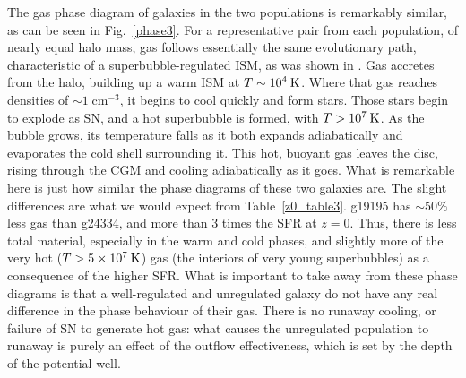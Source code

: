 The gas phase diagram of galaxies in the two populations is remarkably similar,
as can be seen in Fig.~\ref{phase3}.  For a representative pair from each
population, of nearly equal halo mass, gas follows essentially the same
evolutionary path, characteristic of a superbubble-regulated ISM, as was shown in
\citet{Keller2015}.  Gas accretes from the halo,
building up a warm ISM at $T\sim10^4\>{\rm K}$.  Where that gas reaches densities of
$\sim 1\;$cm$^{-3}$, it begins to cool quickly and form stars.  Those stars begin to
explode as SN, and a hot superbubble is formed, with $T>10^7\>{\rm K}$.  As the bubble
grows, its temperature falls as it both expands adiabatically and evaporates
the cold shell surrounding it.  This hot, buoyant gas leaves the disc, rising
through the CGM and cooling adiabatically as it goes.  What is remarkable here
is just how similar the phase diagrams of these two galaxies are.  The slight
differences are what we would expect from Table~\ref{z0_table3}.  g19195 has
$\sim50\%$ less gas than g24334, and more than 3 times the SFR at $z=0$.  Thus,
there is less total material, especially in the warm and cold phases, and
slightly more of the very hot ($T>5\times10^7\>{\rm K}$) gas (the interiors of very young
superbubbles) as a consequence of the higher SFR.  What is important to take
away from these phase diagrams is that a well-regulated and unregulated galaxy
do not have any real difference in the phase behaviour of their gas.  There is
no runaway cooling, or failure of SN to generate hot gas:  what causes the
unregulated population to runaway is purely an effect of the outflow
effectiveness, which is set by the depth of the potential well.

